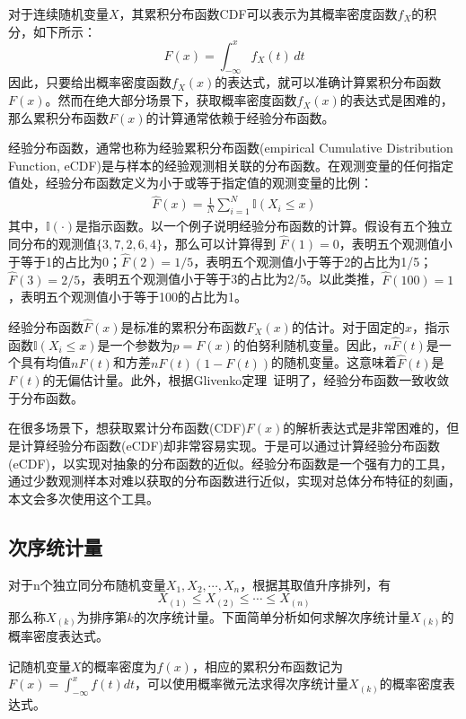 对于连续随机变量$X$，其累积分布函数CDF可以表示为其概率密度函数$f_X$的积分，如下所示：
\[{\displaystyle F(x)=\int _{-\infty }^{x}f_{X}(t)\,dt}\]
因此，只要给出概率密度函数$f_X(x)$的表达式，就可以准确计算累积分布函数$F(x)$。然而在绝大部分场景下，获取概率密度函数$f_X(x)$的表达式是困难的，那么累积分布函数$F(x)$的计算通常依赖于经验分布函数。

经验分布函数，通常也称为经验累积分布函数(empirical Cumulative Distribution Function, eCDF)是与样本的经验观测相关联的分布函数。在观测变量的任何指定值处，经验分布函数定义为小于或等于指定值的观测变量的比例：
\begin{eqnarray}
\hat F(x) = \frac{1}{N}\sum_{i=1}^{N} \mathbb I (X_i\leq x)
\end{eqnarray}
其中，$\mathbb I(\cdot)$是指示函数。以一个例子说明经验分布函数的计算。假设有五个独立同分布的观测值$\{3,7,2,6,4\}$，那么可以计算得到 $\hat F(1) = 0$，表明五个观测值小于等于1的占比为0；$\hat F(2) = 1/5$，表明五个观测值小于等于2的占比为1/5；$\hat F(3) = 2/5$，表明五个观测值小于等于3的占比为2/5。以此类推，$\hat F(100) = 1$，表明五个观测值小于等于100的占比为1。


经验分布函数$\hat F(x)$是标准的累积分布函数$ F_{X}(x)$的估计\cite{mou:2006}。对于固定的$x$，指示函数${\displaystyle \mathbb {I}({X_{i}\leq x})}$是一个参数为$p=F(x)$的伯努利随机变量。因此，${\displaystyle n{\widehat {F}}(t)}$是一个具有均值$nF(t)$和方差$nF(t)(1-F(t))$的随机变量。这意味着$\hat F(t)$是$F(t)$的无偏估计量。此外，根据Glivenko定理~\cite{glivenko:1933}证明了，经验分布函数一致收敛于分布函数。

在很多场景下，想获取累计分布函数(CDF)$F(x)$的解析表达式是非常困难的，但是计算经验分布函数(eCDF)却非常容易实现。于是可以通过计算经验分布函数(eCDF)，以实现对抽象的分布函数的近似。经验分布函数是一个强有力的工具，通过少数观测样本对难以获取的分布函数进行近似，实现对总体分布特征的刻画，本文会多次使用这个工具。

\subsection{次序统计量}\label{order}
对于n个独立同分布随机变量$X_1, X_2, \cdots, X_n$，根据其取值升序排列，有
\[X_{(1)} \leq X_{(2)} \leq \cdots \leq X_{(n)} \]
那么称$X_{(k)}$为排序第$k$的次序统计量\cite{David:2004}。下面简单分析如何求解次序统计量$X_{(k)}$的概率密度表达式。

记随机变量$X$的概率密度为$f(x)$，相应的累积分布函数记为$F(x) = \int_{ - \infty }^x f(t)dt$，可以使用概率微元法\cite{mou:2006}求得次序统计量$X_{(k)}$的概率密度表达式。

